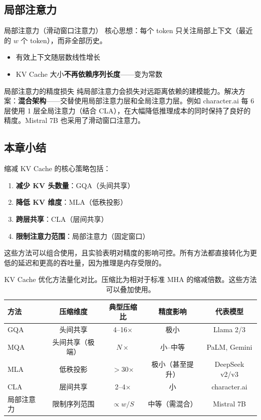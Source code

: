 \subsection{局部注意力}

\begin{importantbox}{局部注意力（滑动窗口注意力）}
核心思想：每个 token 只关注局部上下文（最近的 $w$ 个 token），而非全部历史。
\begin{itemize}
    \item 有效上下文随层数线性增长
    \item KV Cache 大小\textbf{不再依赖序列长度}——变为常数
\end{itemize}
\end{importantbox}

\begin{warningbox}{局部注意力的精度损失}
纯局部注意力会损失对远距离依赖的建模能力。解决方案：\textbf{混合架构}——交替使用局部注意力层和全局注意力层。例如 character.ai 每 6 层使用 1 层全局注意力（结合 CLA），在大幅降低推理成本的同时保持了良好的精度。Mistral 7B 也采用了滑动窗口注意力。
\end{warningbox}

\subsection{本章小结}

缩减 KV Cache 的核心策略包括：
\begin{enumerate}
    \item \textbf{减少 KV 头数量}：GQA（头间共享）
    \item \textbf{降低 KV 维度}：MLA（低秩投影）
    \item \textbf{跨层共享}：CLA（层间共享）
    \item \textbf{限制注意力范围}：局部注意力（固定窗口）
\end{enumerate}
这些方法可以组合使用，且实验表明对精度的影响可控。所有方法都直接转化为更低的延迟和更高的吞吐量，因为推理是内存受限的。

\begin{table}[H]
\centering
\begin{tabular}{lcccc}
\toprule
\textbf{方法} & \textbf{压缩维度} & \textbf{典型压缩比} & \textbf{精度影响} & \textbf{代表模型} \\
\midrule
GQA & 头间共享 & 4--16$\times$ & 极小 & Llama 2/3 \\
MQA & 头间共享（极端） & $N\times$ & 小--中等 & PaLM, Gemini \\
MLA & 低秩投影 & $>$30$\times$ & 极小（甚至提升） & DeepSeek v2/v3 \\
CLA & 层间共享 & 2--4$\times$ & 小 & character.ai \\
局部注意力 & 限制序列范围 & $\propto w/S$ & 中等（需混合） & Mistral 7B \\
\bottomrule
\end{tabular}
\caption{KV Cache 优化方法量化对比。压缩比为相对于标准 MHA 的缩减倍数。这些方法可以叠加使用。}
\end{table}


